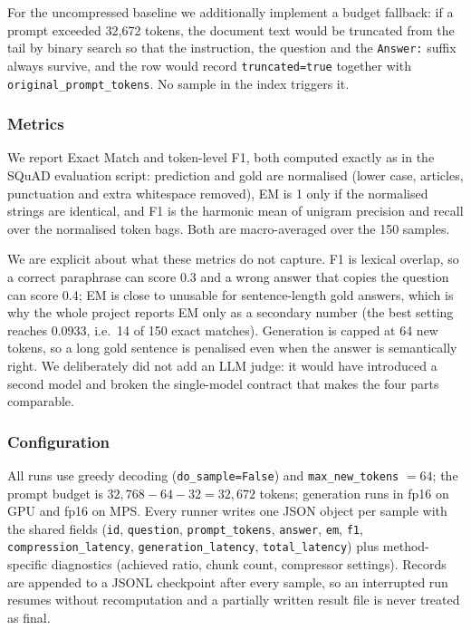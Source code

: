 \documentclass[10pt,a4paper,twocolumn]{article}
\begin{document}
For the uncompressed baseline we additionally implement a budget fallback: if a
prompt exceeded 32{,}672 tokens, the document text would be truncated from the
tail by binary search so that the instruction, the question and the
\texttt{Answer:} suffix always survive, and the row would record
\texttt{truncated=true} together with \texttt{original\_prompt\_tokens}. No sample
in the index triggers it.

\subsubsection{Metrics}

We report Exact Match and token-level F1, both computed exactly as in the SQuAD
evaluation script: prediction and gold are normalised (lower case, articles,
punctuation and extra whitespace removed), EM is 1 only if the normalised strings
are identical, and F1 is the harmonic mean of unigram precision and recall over
the normalised token bags. Both are macro-averaged over the 150 samples.

We are explicit about what these metrics do not capture. F1 is lexical overlap, so
a correct paraphrase can score 0.3 and a wrong answer that copies the question can
score 0.4; EM is close to unusable for sentence-length gold answers, which is why
the whole project reports EM only as a secondary number (the best setting reaches
0.0933, i.e.\ 14 of 150 exact matches). Generation is capped at 64 new tokens, so
a long gold sentence is penalised even when the answer is semantically right. We
deliberately did not add an LLM judge: it would have introduced a second model and
broken the single-model contract that makes the four parts comparable.

\subsubsection{Configuration}

All runs use greedy decoding (\texttt{do\_sample=False}) and
\texttt{max\_new\_tokens} $=64$; the prompt budget is
$32{,}768-64-32=32{,}672$ tokens; generation runs in fp16 on GPU and fp16 on MPS.
Every runner writes one JSON object per sample with the shared fields
(\texttt{id}, \texttt{question}, \texttt{prompt\_tokens}, \texttt{answer},
\texttt{em}, \texttt{f1}, \texttt{compression\_latency},
\texttt{generation\_latency}, \texttt{total\_latency}) plus method-specific
diagnostics (achieved ratio, chunk count, compressor settings). Records are
appended to a JSONL checkpoint after every sample, so an interrupted run resumes
without recomputation and a partially written result file is never treated as
final.
\end{document}
